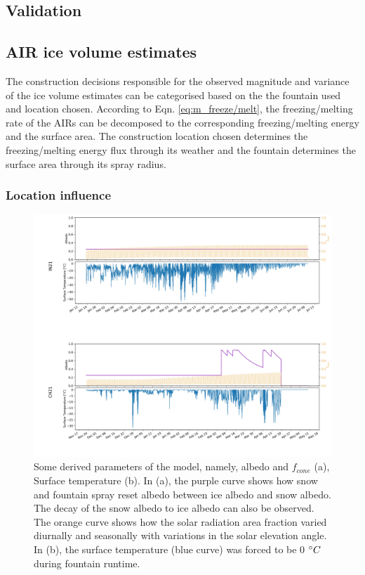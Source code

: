 \documentclass[utf8]{frontiersSCNS} %
\begin{document}
\subsection{Validation}

\subsection{AIR ice volume estimates}

The construction decisions responsible for the observed magnitude and variance of the ice volume estimates can be
categorised based on the the fountain used and location chosen. According to Eqn. \ref{eq:m_freeze/melt}, the
freezing/melting rate of the AIRs can be decomposed to the corresponding freezing/melting energy and the surface
area. The construction location chosen determines the freezing/melting energy flux through its weather and the
fountain determines the surface area through its spray radius.

\subsubsection{Location influence}

\begin{figure}
	\begin{center}
		\includegraphics[width=\linewidth]{Figures/albedo.jpg}
	\end{center}
	\caption{Some derived parameters of the model, namely, albedo and $f_{cone}$ (a), Surface temperature (b). In
		(a), the purple curve shows how snow and fountain spray reset albedo between ice albedo and snow albedo.  The
		decay of the snow albedo to ice albedo can also be observed. The orange curve shows how the solar radiation area
		fraction varied diurnally and seasonally with variations in the solar elevation angle. In (b), the surface
		temperature (blue curve) was forced to be 0 $\degree C$ during fountain runtime.}
	\label{fig:albedo}
\end{figure}
\end{document}
